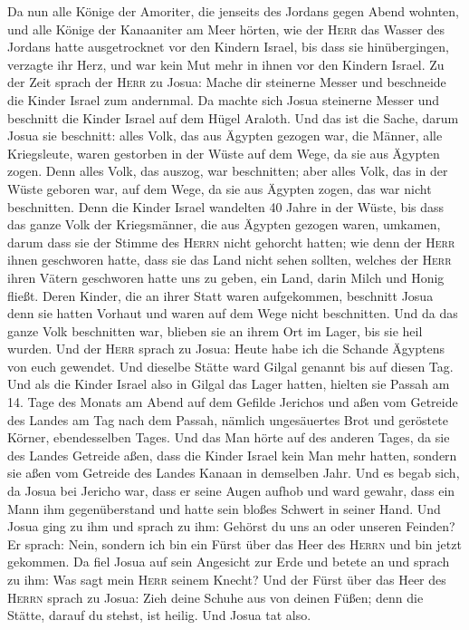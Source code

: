  Da nun alle Könige der Amoriter, die jenseits des Jordans
gegen Abend wohnten, und alle Könige der Kanaaniter am Meer hörten, wie
der \textsc{Herr} das Wasser des Jordans hatte ausgetrocknet vor den
Kindern Israel, bis dass sie hinübergingen, verzagte ihr Herz, und war
kein Mut mehr in ihnen vor den Kindern Israel.  Zu der
Zeit sprach der \textsc{Herr} zu Josua: Mache dir steinerne Messer und
beschneide die Kinder Israel zum andernmal.  Da machte
sich Josua steinerne Messer und beschnitt die Kinder Israel auf dem
Hügel Araloth.  Und das ist die Sache, darum Josua sie
beschnitt: alles Volk, das aus Ägypten gezogen war, die Männer, alle
Kriegsleute, waren gestorben in der Wüste auf dem Wege, da sie aus
Ägypten zogen.  Denn alles Volk, das auszog, war
beschnitten; aber alles Volk, das in der Wüste geboren war, auf dem
Wege, da sie aus Ägypten zogen, das war nicht beschnitten.
 Denn die Kinder Israel wandelten 40 Jahre in der Wüste,
bis dass das ganze Volk der Kriegsmänner, die aus Ägypten gezogen waren,
umkamen, darum dass sie der Stimme des \textsc{Herrn} nicht gehorcht
hatten; wie denn der \textsc{Herr} ihnen geschworen hatte, dass sie das
Land nicht sehen sollten, welches der \textsc{Herr} ihren Vätern
geschworen hatte uns zu geben, ein Land, darin Milch und Honig fließt.
 Deren Kinder, die an ihrer Statt waren aufgekommen,
beschnitt Josua denn sie hatten Vorhaut und waren auf dem Wege nicht
beschnitten.  Und da das ganze Volk beschnitten war,
blieben sie an ihrem Ort im Lager, bis sie heil wurden. 
Und der \textsc{Herr} sprach zu Josua: Heute habe ich die Schande
Ägyptens von euch gewendet. Und dieselbe Stätte ward Gilgal genannt bis
auf diesen Tag.  Und als die Kinder Israel also in Gilgal
das Lager hatten, hielten sie Passah am 14. Tage des Monats am Abend auf
dem Gefilde Jerichos  und aßen vom Getreide des Landes am
Tag nach dem Passah, nämlich ungesäuertes Brot und geröstete Körner,
ebendesselben Tages.  Und das Man hörte auf des anderen
Tages, da sie des Landes Getreide aßen, dass die Kinder Israel kein Man
mehr hatten, sondern sie aßen vom Getreide des Landes Kanaan in
demselben Jahr.  Und es begab sich, da Josua bei Jericho
war, dass er seine Augen aufhob und ward gewahr, dass ein Mann ihm
gegenüberstand und hatte sein bloßes Schwert in seiner Hand. Und Josua
ging zu ihm und sprach zu ihm: Gehörst du uns an oder unseren Feinden?
 Er sprach: Nein, sondern ich bin ein Fürst über das Heer
des \textsc{Herrn} und bin jetzt gekommen. Da fiel Josua auf sein
Angesicht zur Erde und betete an und sprach zu ihm: Was sagt mein
\textsc{Herr} seinem Knecht?  Und der Fürst über das Heer
des \textsc{Herrn} sprach zu Josua: Zieh deine Schuhe aus von deinen
Füßen; denn die Stätte, darauf du stehst, ist heilig. Und Josua tat
also.

